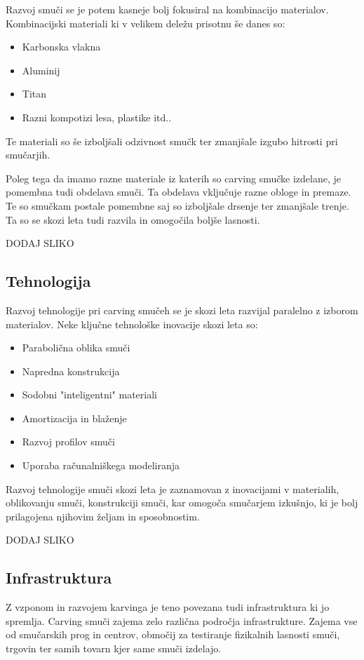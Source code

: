 \documentclass{article}
\begin{document}
Razvoj smuči se je potem kasneje bolj fokusiral na kombinacijo materialov.
Kombinacijski materiali ki v velikem deležu prisotnu še danes so: 
\begin{itemize}
    \item Karbonska vlakna
    \item Aluminij
    \item Titan
    \item Razni kompotizi lesa, plastike itd..
\end{itemize}
Te materiali so še izboljšali odzivnost smučk ter zmanjšale izgubo hitrosti pri smučarjih.

\*

Poleg tega da imamo razne materiale iz katerih so carving smučke izdelane, je pomembna tudi obdelava smuči.
Ta obdelava vključuje razne obloge in premaze. Te so smučkam postale pomembne saj so izboljšale drsenje ter zmanjšale trenje. 
Ta so se skozi leta tudi razvila in omogočila boljše lasnosti.

DODAJ SLIKO

\subsection*{Tehnologija}
Razvoj tehnologije pri carving smučeh se je skozi leta razvijal paralelno z izborom materialov.
Neke ključne tehnološke inovacije skozi leta so:
\begin{itemize}
    \item Parabolična oblika smuči
    \item Napredna konstrukcija
    \item Sodobni "inteligentni" materiali
    \item Amortizacija in blaženje
    \item Razvoj profilov smuči
    \item Uporaba računalniškega modeliranja
\end{itemize}

\*

Razvoj tehnologije smuči skozi leta je zaznamovan z inovacijami v materialih, oblikovanju smuči, konstrukciji smuči, kar omogoča smučarjem izkušnjo, ki je bolj prilagojena njihovim željam in sposobnostim.

DODAJ SLIKO

\subsection*{Infrastruktura}
Z vzponom in razvojem karvinga je teno povezana tudi infrastruktura ki jo spremlja.
Carving smuči zajema zelo različna področja infrastrukture. Zajema vse od smučarskih prog in centrov, območij za testiranje fizikalnih lasnosti smuči, trgovin ter samih tovarn kjer same smuči izdelajo.
\end{document}

